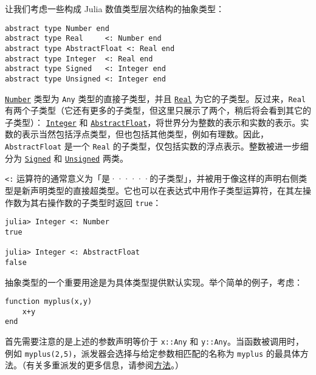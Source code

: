 让我们考虑一些构成 Julia 数值类型层次结构的抽象类型：




\begin{verbatim}
abstract type Number end
abstract type Real     <: Number end
abstract type AbstractFloat <: Real end
abstract type Integer  <: Real end
abstract type Signed   <: Integer end
abstract type Unsigned <: Integer end
\end{verbatim}



\hyperlink{1990584313715697055}{\texttt{Number}} 类型为 \texttt{Any} 类型的直接子类型，并且 \hyperlink{6175959395021454412}{\texttt{Real}} 为它的子类型。反过来，\texttt{Real} 有两个子类型（它还有更多的子类型，但这里只展示了两个，稍后将会看到其它的子类型）： \hyperlink{8469131683393450448}{\texttt{Integer}} 和 \hyperlink{11465394427882483091}{\texttt{AbstractFloat}}，将世界分为整数的表示和实数的表示。实数的表示当然包括浮点类型，但也包括其他类型，例如有理数。因此，\texttt{AbstractFloat} 是一个 \texttt{Real} 的子类型，仅包括实数的浮点表示。整数被进一步细分为 \hyperlink{14154866400772377486}{\texttt{Signed}} 和 \hyperlink{4780971278803506664}{\texttt{Unsigned}} 两类。



\texttt{<:} 运算符的通常意义为「是······的子类型」，并被用于像这样的声明右侧类型是新声明类型的直接超类型。它也可以在表达式中用作子类型运算符，在其左操作数为其右操作数的子类型时返回 \texttt{true}：




\begin{verbatim}
julia> Integer <: Number
true

julia> Integer <: AbstractFloat
false
\end{verbatim}



抽象类型的一个重要用途是为具体类型提供默认实现。举个简单的例子，考虑：




\begin{verbatim}
function myplus(x,y)
    x+y
end
\end{verbatim}



首先需要注意的是上述的参数声明等价于 \texttt{x::Any} 和 \texttt{y::Any}。当函数被调用时，例如 \texttt{myplus(2,5)}，派发器会选择与给定参数相匹配的名称为 \texttt{myplus} 的最具体方法。（有关多重派发的更多信息，请参阅\hyperlink{3842379394166369470}{方法}。）



